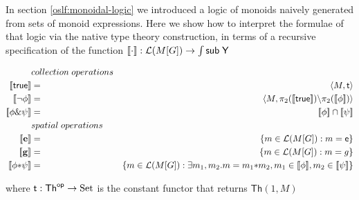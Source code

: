 In section \ref{oslf:monoidal-logic} we introduced a logic of monoids
naively generated from sets of monoid expressions. Here we show how to
interpret the formulae of that logic via the native type theory
construction, in terms of a recursive specification of the function $[\![ \cdot ]\!] : \mathcal{L}(M[G]) \to \int \mathsf{sub} \; \mathsf{Y}$

\begin{eqnarray*}
  & collection \; operations & \\
  \meaningof{\mathsf{true}} & = & \langle M, \mathsf{t}\rangle \\
  \meaningof{\neg \phi} & = & \langle M, \pi_{2}(\meaningof{\mathsf{true}}) \backslash \pi_{2}(\meaningof{\phi}) \rangle \\
  \meaningof{\phi \& \psi} & = & \meaningof{\phi} \cap \meaningof{\psi} \\
  & spatial \; operations & \\
  \meaningof{\mathbf{e}} & = & \{ m \in \mathcal{L}(M[G]) : m = \mathsf{e} \} \\
  \meaningof{\mathbf{g}} & = & \{ m \in \mathcal{L}(M[G]) : m = g \} \\
  \meaningof{\phi \mathbf{*} \psi} & = & \{ m \in \mathcal{L}(M[G]) : \exists m_{1}, m_{2}.m = m_{1} \mathsf{*} m_{2}, m_{1} \in \meaningof{\phi}, m_{2} \in \meaningof{\psi} \}
\end{eqnarray*}

where $\mathsf{t} : \mathsf{Th}^{\mathsf{op}} \to {\rm Set}$ is the constant functor that returns $\mathsf{Th}(1,M)$
